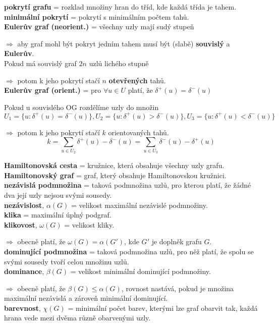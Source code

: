 \documentclass[12pt]{article}
\begin{document}
\noindent
\textbf{pokrytí grafu} = rozklad množiny hran do tříd, kde každá třída je tahem.\\
\textbf{minimální pokrytí} = pokrytí s minimálním počtem tahů.\\
\textbf{Eulerův graf (neorient.)} = všechny uzly mají sudý stupeň

$\Rightarrow$ aby graf mohl být pokryt jedním tahem musí být (slabě) \textbf{souvislý} a \textbf{Eulerův}.\\

\noindent
Pokud má souvislý graf $2n$ uzlů lichého stupně

$\Rightarrow$ potom k jeho pokrytí stačí $n$ \textbf{otevřených} tahů.\\

\noindent
\textbf{Eulerův graf (orient.)} = pro $\forall u \in U$ platí, že $ \delta^+(u) = \delta^-(u)$

\noindent
Pokud u souvislého OG rozdělíme uzly do množin $U_1 = \{ u : \delta^+(u) = \delta^-(u)\}, U_2 = \{ u : \delta^+(u) > \delta^-(u)\}, U_3 = \{ u : \delta^+(u) < \delta^-(u)\}$

$\Rightarrow$ potom k jeho pokrytí stačí $k$ orientovaných tahů.
$$k=\sum_{u \in U_2}{\delta^+(u)-\delta^-(u)}=\sum_{u \in U_3}{\delta^-(u)-\delta^+(u)}$$

\noindent
\textbf{Hamiltonovská cesta} = kružnice, která obsahuje všechny uzly grafu.\\
\textbf{Hamiltonovský graf} = graf, který obsahuje Hamiltonovskou kružnici.\\

\noindent
\textbf{nezávislá podmnožina} = taková podmnožina uzlů, pro kterou platí, že žádné dva její uzly nejsou svými sousedy.\\
\textbf{nezávislost}, $\alpha(G)$ = velikost maximální nezávislé podmnožiny.\\
\textbf{klika} = maximální úplný podgraf.\\
\textbf{klikovost}, $\omega(G)$ = velikost kliky.

$\Rightarrow$ obecně platí, že $\omega(G) = \alpha(G')$, kde $G'$ je doplněk grafu $G$.\\
\textbf{dominující podmnožina} = taková podmnožina uzlů, pro něž platí, že spolu se svými sousedy tvoří celou množinu uzlů.\\
\textbf{dominance}, $\beta(G)$ = velikost minimální dominující podmnožiny.

$\Rightarrow$ obecně platí, že $\beta(G) \leq \alpha(G)$, rovnost nastává, pokud je množina maximální nezávislá a zároveň minimální dominující.\\
\textbf{barevnost}, $\chi(G)$ = minimální počet barev, kterými lze graf obarvit tak, každá hrana vede mezi dvěma různě obarvenými uzly.
\end{document}
